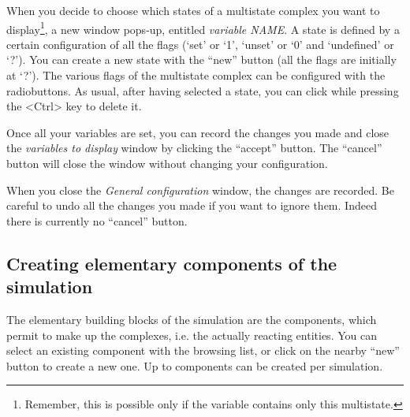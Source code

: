  When you decide to
choose which states of a multistate complex you want to
display\footnote{Remember, this is possible only if the variable contains only
  this multistate.}, a new window pops-up, entitled \emph{variable NAME}. A state
is defined by a certain configuration of all the flags (`set' or `1', `unset'
or `0' and `undefined' or `?').  You can create a new state with the ``new''
button (all the flags are initially at `?').  The various flags of the
multistate complex can be configured with the radiobuttons. As usual, after
having selected a state, you can click while pressing the <Ctrl> key to delete
it.

Once all your variables are set, you can record the changes you made and close
the \emph{variables to display} window by clicking the ``accept'' button. The
``cancel'' button will close the window without changing your configuration.

When you close the \emph{General configuration} window, the changes are
recorded. Be careful to undo all the changes you made if you want to ignore
them. Indeed there is currently no ``cancel'' button.

\subsection{Creating elementary components of the simulation}

The elementary building blocks of the simulation are the components, which
permit to make up the complexes, i.e. the actually reacting entities.  You can
select an existing component with the browsing list, or click on the nearby
``new'' button to create a new one. Up to \MAXCOMPONENTS{} components can be
created per simulation.

